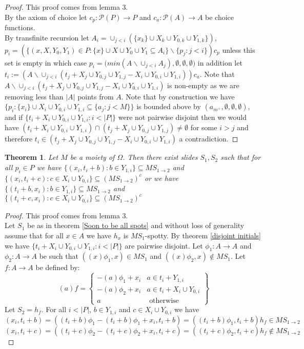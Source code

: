 \documentclass{report}
\newtheorem{theorem}{Theorem}[section]
\begin{document}
\begin{proof}
This proof comes from \cite{shuffle2} lemma 3.\\
By the axiom of choice let \(c_p:\mathcal{P}(P) \rightarrow P\) and \(c_a:\mathcal{P}(A) \rightarrow A\) be choice functions.\\
By transfinite recursion let \(A_{i}=\cup_{j<i}(\{x_k\}\cup X_k \cup Y_{0,k} \cup Y_{1,k}\})\), \(p_i=(\{(x,X,Y_0,Y_1)\in P: \{x\}\cup X \cup Y_0 \cup Y_1\subseteq A_i\} \backslash \{p_j:j<i\})c_p\) unless this set is empty in which case \(p_i=(min{(A\backslash \cup_{j<i}A_j),\emptyset,\emptyset,\emptyset)}\) in addition let \(t_i:=(A\backslash \cup_{j<i}(t_j+X_j \cup Y_{0,j} \cup Y_{1,j}-X_i \cup Y_{0,i} \cup Y_{1,i}))c_a\). Note that \(A\backslash \cup_{j<i}{(t_j+X_j \cup Y_{0,j} \cup Y_{1,j}-X_i \cup Y_{0,i} \cup Y_{1,i})}\) is non-empty as we are removing less than \(|A|\) points from \(A\). Note that by construction we have \(\{p_i:\{x_i\}\cup X_i \cup Y_{0,i}\cup Y_{1,i}\subseteq \{a_j:j< M\}\}\) is bounded above by \((a_{m^+},\emptyset,\emptyset,\emptyset)\), and if \(\{t_i+X_i \cup Y_{0,i} \cup Y_{1,i}:i <|P|\}\) were not pairwise disjoint then we would have \((t_i+X_i \cup Y_{0,i} \cup Y_{1,i})\cap (t_j+X_j \cup Y_{0,j} \cup Y_{1,j})\neq \emptyset\) for some \(i>j\) and therefore \(t_i\in (t_j+X_j \cup Y_{0,j} \cup Y_{1,j}-X_i \cup Y_{0,i} \cup Y_{1,i})\) a contradiction.
\end{proof}
\begin{theorem}\label{disjoint segments slide}
Let \(M\) be a moiety of \(\Omega\). Then there exist slides \(S_1,S_2\) such that for all \(p_i \in P\) we have \(\{(x_i,t_i + b):b\in Y_{1,i}\}\subseteq MS_{1\rightarrow 2}\) and \(\{(x_i,t_i+c):c\in X_i\cup Y_{0,i}\}\subseteq (MS_{1\rightarrow 2})^c\) or we have \(\{(t_i + b,x_i):b\in Y_{1,i}\}\subseteq MS_{1\rightarrow 2}\) and \(\{(t_i+c,x_i):c\in X_i\cup Y_{0,i}\}\subseteq (MS_{1\rightarrow 2})^c\)
\end{theorem}
\begin{proof}
This proof comes from \cite{shuffle2} lemma 3.\\
Let \(S_1\) be as in theorem \ref{Soon to be all spots} and without loss of generality assume that for all \(x \in A\) we have \(h_x\) is \(MS_1\)-spotty. By theorem \ref{disjoint initials} we have \(\{t_i+X_i \cup Y_{0,i} \cup Y_{1,i}:i <|P|\}\) are pairwise disjoint. Let \(\phi_1:A\rightarrow A\) and \(\phi_2:A\rightarrow A\) be such that \(((x)\phi_1,x)\in MS_1\) and \(((x)\phi_2,x)\notin MS_1\). Let \(f:A\rightarrow A\) be defined by:
\[(a)f= \left\{ 
	\begin{array}{lr} 
			-(a)\phi_1 + x_i & a \in t_i + Y_{1,i} \\
		-(a)\phi_2 + x_i & a \in t_i+X_i\cup Y_{0,i} \\
		a & \text{ otherwise }
	\end{array}\right\}\]
Let \(S_2=h_f\). For all \(i < |P|\), \(b\in Y_{1,i}\) and \(c \in X_i \cup Y_{0,i}\) we have 
\[(x_i,t_i+b)=((t_i+b)\phi_1-(t_i+b)\phi_1 +x_i,t_i+b)=((t_i+b)\phi_1,t_i+b)h_f\in MS_{1\rightarrow 2}\] 
\[(x_i,t_i+c)=((t_i+c)\phi_2-(t_i+c)\phi_2 +x_i,t_i+c)=((t_i+c)\phi_2,t_i+c)h_f\notin MS_{1\rightarrow 2}\] 
\end{proof}
\end{document}
